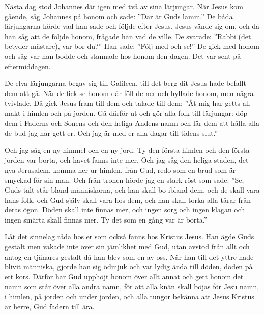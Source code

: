 
Nästa dag stod Johannes där igen med två av sina lärjungar. 
När Jesus kom gående, såg Johannes på honom och sade: ”Där är Guds lamm.” 
De båda lärjungarna hörde vad han sade och följde efter Jesus. 
Jesus vände sig om, och då han såg att de följde honom, frågade han vad de ville. De svarade: ”Rabbi (det betyder mästare), var bor du?” 
Han sade: ”Följ med och se!” De gick med honom och såg var han bodde och stannade hos honom den dagen. Det var sent på eftermiddagen.



De elva lärjungarna begav sig till Galileen, till det berg dit Jesus hade befallt dem att gå. 
När de fick se honom där föll de ner och hyllade honom, men några tvivlade. 
Då gick Jesus fram till dem och talade till dem: ”Åt mig har getts all makt i himlen och på jorden. 
Gå därför ut och gör alla folk till lärjungar: döp dem i Faderns och Sonens och den heliga Andens namn och lär dem att hålla alla de bud jag har gett er. Och jag är med er alla dagar till tidens slut.”





Och jag såg en ny himmel och en ny jord. Ty den första himlen och den första jorden var borta, och havet fanns inte mer. 
Och jag såg den heliga staden, det nya Jerusalem, komma ner ur himlen, från Gud, redo som en brud som är smyckad för sin man. 
Och från tronen hörde jag en stark röst som sade: ”Se, Guds tält står bland människorna, och han skall bo ibland dem, och de skall vara hans folk, och Gud själv skall vara hos dem, 
och han skall torka alla tårar från deras ögon. Döden skall inte finnas mer, och ingen sorg och ingen klagan och ingen smärta skall finnas mer. Ty det som en gång var är borta.” 



  Låt det sinnelag råda hos er som också fanns hos Kristus Jesus. 
Han ägde Guds gestalt men vakade inte över sin jämlikhet med Gud, 
utan avstod från allt och antog en tjänares gestalt då han blev som en av oss. När han till det yttre hade blivit människa, gjorde han sig ödmjuk och var lydig ända till döden, döden på ett kors. 
Därför har Gud upphöjt honom över allt annat och gett honom det namn som står över alla andra namn, för att alla knän skall böjas för Jesu namn, i himlen, på jorden och under jorden, och alla tungor bekänna att Jesus Kristus är herre, Gud fadern till ära.



